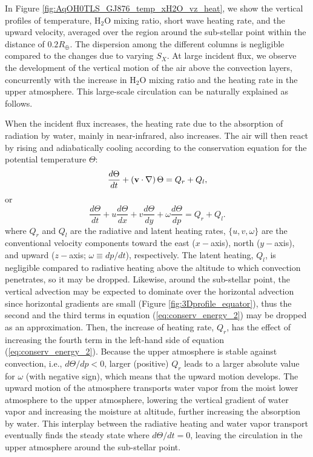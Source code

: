 \documentclass[11pt,numberedappendix,twocolappendix,]{emulateapj}
\def\water{H$_2$O }
\begin{document}
In Figure \ref{fig:AqOH0TLS_GJ876_temp_xH2O_vz_heat}, we show the vertical  profiles of temperature, \water mixing ratio, short wave heating rate, and the upward velocity, averaged over the region around the sub-stellar point within the distance of $0.2R_{\oplus }$. 
The dispersion among the different columns is negligible compared to the changes due to varying $S_X$. 
At large incident flux, we observe the development of the vertical motion of the air above the convection layers, concurrently with the increase in \water mixing ratio and the heating rate in the upper atmosphere. 
This large-scale circulation can be naturally explained as follows. 

When the incident flux increases, the heating rate due to the absorption of radiation by water, mainly in near-infrared, also increases. 
The air will then react by rising and adiabatically cooling according to the conservation equation for the potential temperature $\Theta $:
\begin{equation}
\frac{d\Theta }{dt} + ( {\bf v} \cdot \nabla ) \, \Theta = Q_r + Q_l, \label{eq:conserv_energy}
\end{equation}
or
\begin{equation}
\frac{d\Theta }{dt} + u \frac{d\Theta }{dx} + v \frac{d\Theta }{dy} + \omega \frac{d\Theta }{dp} = Q_r + Q_l. \label{eq:conserv_energy_2}
\end{equation}
where $Q_r$ and $Q_l$ are the radiative and latent heating rates, $\{ u, v, \omega \}$ are the conventional velocity components toward the east ($x-$axis), north ($y-$axis), and upward ($z-$axis; $\omega \equiv  dp/dt$), respectively. 
The latent heating, $Q_l$, is negligible compared to radiative heating above the altitude to which convection penetrates, so it may be dropped. 
Likewise, around the sub-stellar point, the vertical advection may be expected to dominate over the horizontal advection since horizontal gradients are small (Figure \ref{fig:3Dprofile_equator}), thus the second and the third terms in equation (\ref{eq:conserv_energy_2}) may be dropped as an approximation. 
Then, the increase of heating rate, $Q_r$, has the effect of increasing the fourth term in the left-hand side of equation (\ref{eq:conserv_energy_2}). 
Because the upper atmosphere is stable against convection, i.e., $d \Theta / d p < 0 $, larger (positive) $Q_r$ leads to a larger absolute value for $\omega $ (with negative sign), which means that the upward motion develops. 
The upward motion of the atmosphere transports water vapor from the moist lower atmosphere to the upper atmosphere, lowering the vertical gradient of water vapor and increasing the moisture at altitude, further increasing the absorption by water. 
This interplay between the radiative heating and water vapor transport eventually finds the steady state where $d\Theta/dt = 0$, leaving the  circulation in the upper atmosphere around the sub-stellar point. 
\end{document}
